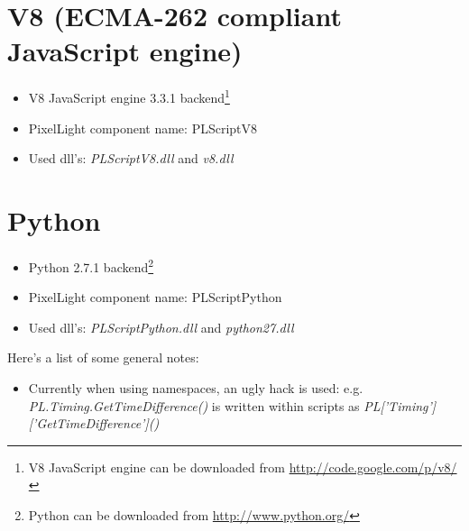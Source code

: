 \section{V8 (ECMA-262 compliant JavaScript engine)}
\begin{itemize}
\item V8 JavaScript engine 3.3.1 backend\footnote{V8 JavaScript engine can be downloaded from \url{http://code.google.com/p/v8/}}
\item PixelLight component name: PLScriptV8
\item Used dll's: \emph{PLScriptV8.dll} and \emph{v8.dll}
\end{itemize}




\section{Python}
\begin{itemize}
\item Python 2.7.1 backend\footnote{Python can be downloaded from \url{http://www.python.org/}}
\item PixelLight component name: PLScriptPython
\item Used dll's: \emph{PLScriptPython.dll} and \emph{python27.dll}
\end{itemize}

Here's a list of some general notes:
\begin{itemize}
\item Currently when using namespaces, an ugly hack is used: e.g. \emph{PL.Timing.GetTimeDifference()} is written within scripts as \emph{PL['Timing']['GetTimeDifference']()}
\end{itemize}
